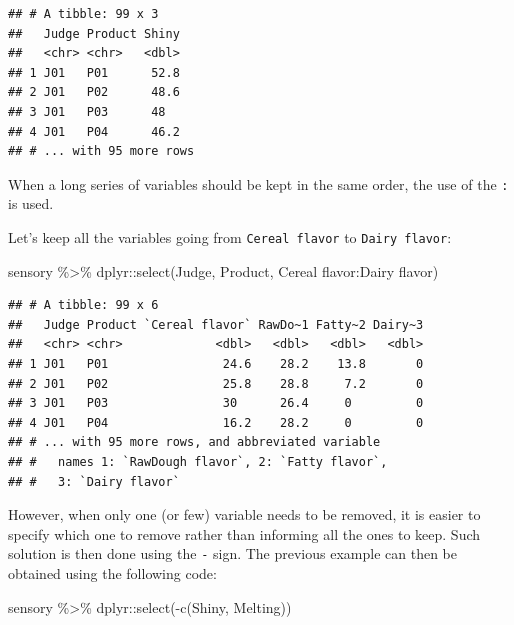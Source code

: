 \documentclass[
]{krantz}
\makeatletter
\newenvironment{Shaded}{\begin{snugshade}}{\end{snugshade}}
\newcommand{\AttributeTok}[1]{\textcolor[rgb]{0.61,0.61,0.61}{#1}}
\newcommand{\FunctionTok}[1]{\textcolor[rgb]{0,0,0}{#1}}
\newcommand{\NormalTok}[1]{#1}
\newcommand{\SpecialCharTok}[1]{\textcolor[rgb]{0,0,0}{#1}}
\newcommand{\StringTok}[1]{\textcolor[rgb]{0.5,0.5,0.5}{#1}}
\newenvironment{kframe}{%
\medskip{}
\setlength{\fboxsep}{.8em}
 \def\at@end@of@kframe{}%
 \ifinner\ifhmode%
  \def\at@end@of@kframe{\end{minipage}}%
  \begin{minipage}{\columnwidth}%
 \fi\fi%
 \def\FrameCommand##1{\hskip\@totalleftmargin \hskip-\fboxsep
 \colorbox{shadecolor}{##1}\hskip-\fboxsep
     \hskip-\linewidth \hskip-\@totalleftmargin \hskip\columnwidth}%
 \MakeFramed {\advance\hsize-\width
   \@totalleftmargin\z@ \linewidth\hsize
   \@setminipage}}%
 {\par\unskip\endMakeFramed%
 \at@end@of@kframe}
\renewenvironment{Shaded}{\begin{kframe}}{\end{kframe}}
\makeatother
\begin{document}
\begin{verbatim}
## # A tibble: 99 x 3
##   Judge Product Shiny
##   <chr> <chr>   <dbl>
## 1 J01   P01      52.8
## 2 J01   P02      48.6
## 3 J01   P03      48  
## 4 J01   P04      46.2
## # ... with 95 more rows
\end{verbatim}

When a long series of variables should be kept in the same order, the use of the \texttt{:} is used.

Let's keep all the variables going from \texttt{Cereal\ flavor} to \texttt{Dairy\ flavor}:

\begin{Shaded}
\begin{Highlighting}[]
\NormalTok{sensory }\SpecialCharTok{\%\textgreater{}\%}
\NormalTok{  dplyr}\SpecialCharTok{::}\FunctionTok{select}\NormalTok{(Judge, Product, }\StringTok{\textasciigrave{}}\AttributeTok{Cereal flavor}\StringTok{\textasciigrave{}}\SpecialCharTok{:}\StringTok{\textasciigrave{}}\AttributeTok{Dairy flavor}\StringTok{\textasciigrave{}}\NormalTok{)}
\end{Highlighting}
\end{Shaded}

\begin{verbatim}
## # A tibble: 99 x 6
##   Judge Product `Cereal flavor` RawDo~1 Fatty~2 Dairy~3
##   <chr> <chr>             <dbl>   <dbl>   <dbl>   <dbl>
## 1 J01   P01                24.6    28.2    13.8       0
## 2 J01   P02                25.8    28.8     7.2       0
## 3 J01   P03                30      26.4     0         0
## 4 J01   P04                16.2    28.2     0         0
## # ... with 95 more rows, and abbreviated variable
## #   names 1: `RawDough flavor`, 2: `Fatty flavor`,
## #   3: `Dairy flavor`
\end{verbatim}

However, when only one (or few) variable needs to be removed, it is easier to specify which one to remove rather than informing all the ones to keep. Such solution is then done using the \texttt{-} sign. The previous example can then be obtained using the following code:

\begin{Shaded}
\begin{Highlighting}[]
\NormalTok{sensory }\SpecialCharTok{\%\textgreater{}\%}
\NormalTok{  dplyr}\SpecialCharTok{::}\FunctionTok{select}\NormalTok{(}\SpecialCharTok{{-}}\FunctionTok{c}\NormalTok{(Shiny, Melting))}
\end{Highlighting}
\end{Shaded}
\end{document}
